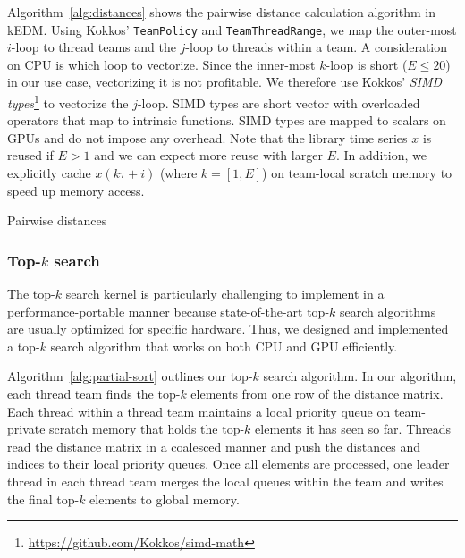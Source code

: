 \documentclass[sigconf]{acmart}
\begin{document}
Algorithm~\ref{alg:distances} shows the pairwise distance calculation
algorithm in kEDM\@. Using Kokkos' \texttt{TeamPolicy} and
\texttt{TeamThreadRange}, we map the outer-most $i$-loop to thread teams and the $j$-loop to
threads within a team. A consideration on CPU is which loop to vectorize.
Since the inner-most $k$-loop is short ($E \leq 20$) in our use case,
vectorizing it is not profitable. We therefore use Kokkos'
\textit{SIMD types}\footnote{\url{https://github.com/Kokkos/simd-math}} to vectorize the
$j$-loop. SIMD types are short vector with overloaded operators that map to
intrinsic functions. SIMD types are mapped to scalars on GPUs and do not
impose any overhead. Note that the library time series $x$ is reused if $E > 1$
and we can expect more reuse with larger $E$. In addition, we explicitly cache
$x(k \tau + i)$ (where $k=[1, E]$) on team-local scratch
memory to speed up memory access.

\begin{algorithm}
    \SetAlgoLined
    \DontPrintSemicolon
    \caption{Pairwise distances}%
    \label{alg:distances}
\end{algorithm}

\subsubsection{Top-$k$ search}

The top-$k$ search kernel is particularly challenging to implement in a performance-portable manner
because state-of-the-art top-$k$ search algorithms~\cite{Johnson2019,Shanbhag2018}
are usually optimized for specific hardware. Thus, we designed and
implemented a top-$k$ search algorithm that works on both CPU and GPU
efficiently.

Algorithm~\ref{alg:partial-sort} outlines our top-$k$ search algorithm. In our algorithm, each
thread team finds the top-$k$ elements from one row of the distance matrix. Each thread within a thread team maintains a local priority queue on
team-private scratch memory that holds the top-$k$ elements it has seen so far. Threads read the distance matrix in a coalesced manner and push the distances and indices to their
local priority queues. Once all elements are processed, one leader thread in each thread team merges
the local queues within the team and writes the final top-$k$ elements to
global memory.
\end{document}

